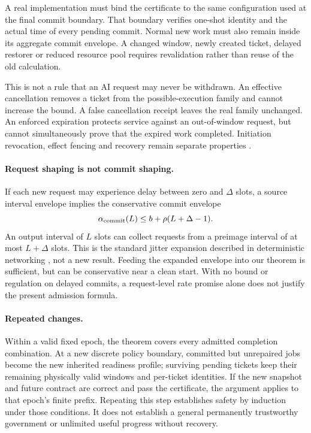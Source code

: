 \documentclass[11pt,a4paper]{article}
\theoremstyle{definition}\newtheorem{definition}{Definition}
\begin{document}
A real implementation must bind the certificate to the same configuration used at the final commit boundary. That boundary verifies one-shot identity and the actual time of every pending commit. Normal new work must also remain inside its aggregate commit envelope. A changed window, newly created ticket, delayed restorer or reduced resource pool requires revalidation rather than reuse of the old calculation.

This is not a rule that an AI request may never be withdrawn. An effective cancellation removes a ticket from the possible-execution family and cannot increase the bound. A false cancellation receipt leaves the real family unchanged. An enforced expiration protects service against an out-of-window request, but cannot simultaneously prove that the expired work completed. Initiation revocation, effect fencing and recovery remain separate properties \cite{quiescence}.

\paragraph{Request shaping is not commit shaping.}
If each new request may experience delay between zero and $\Delta$ slots, a source interval envelope implies the conservative commit envelope
\begin{equation}
\alpha_{\rm commit}(L)\le b+\rho(L+\Delta-1).
\end{equation}
An output interval of $L$ slots can collect requests from a preimage interval of at most $L+\Delta$ slots. This is the standard jitter expansion described in deterministic networking \cite{detnet}, not a new result. Feeding the expanded envelope into our theorem is sufficient, but can be conservative near a clean start. With no bound or regulation on delayed commits, a request-level rate promise alone does not justify the present admission formula.

\paragraph{Repeated changes.}
Within a valid fixed epoch, the theorem covers every admitted completion combination. At a new discrete policy boundary, committed but unrepaired jobs become the new inherited readiness profile; surviving pending tickets keep their remaining physically valid windows and per-ticket identities. If the new snapshot and future contract are correct and pass the certificate, the argument applies to that epoch's finite prefix. Repeating this step establishes safety by induction under those conditions. It does not establish a general permanently trustworthy government or unlimited useful progress without recovery.
\end{document}
